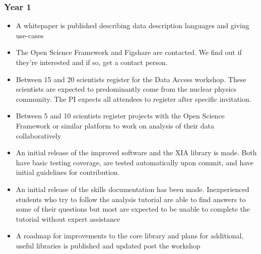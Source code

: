 \documentclass[11pt,oneside]{memoir}
\begin{document}
\subsubsection*{Year 1}
\begin{itemize}
  \item A whitepaper is published describing data description languages and giving use-cases
  \item The Open Science Framework and Figshare are contacted.  We find out if they're interested and if so, get a contact person.
  \item Between 15 and 20 scientists register for the Data Access workshop.  These scientists are expected to predominantly come from the nuclear physics community.  The PI expects all attendees to register after specific invitation.
  \item Between 5 and 10 scientists register projects with the Open Science Framework or similar platform to work on analysis of their data collaboratively
  \item An initial release of the improved software and the XIA library is made.  Both have basic testing coverage, are tested automatically upon commit, and have initial guidelines for contribution.
  \item An initial release of the skills documentation has been made.  Inexperienced students who try to follow the analysis tutorial are able to find answers to some of their questions but most are expected to be unable to complete the tutorial without expert assistance
  \item A roadmap for improvements to the core library and plans for additional, useful libraries is published and updated post the workshop
\end{itemize}
\end{document}

